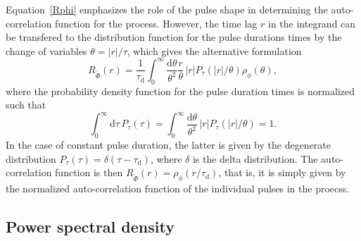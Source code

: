 \documentclass[aps,prb,12pt,a4paper,preprint,amsmath,amssymb,groupedaddress]{revtex4-1}
\newcommand{\abs}[1]{{\left|#1\right|}}\newcommand{\order}[1]{{\mathcal{O}\left(#1\right)}}
\newcommand{\rmd}{\text{d}}
\newcommand{\taud}{\ensuremath{\tau_\text{d}}}
\newcommand{\Phiwt}{\ensuremath{\widetilde{\Phi}}}
\begin{document}
Equation~\eqref{Rphi} emphasizes the role of the pulse shape in determining the auto-correlation function for the process. However, the time lag $r$ in the integrand can be transfered to the distribution function for the pulse durations times by the change of variables $\theta=\abs{r}/\tau$, which gives the alternative formulation
\begin{equation}
R_{\Phiwt}(r) = \frac{1}{\taud}\int_0^\infty \frac{\rmd\theta}{\theta^2}\frac{r}{\theta}\,\abs{r} P_\tau(\abs{r}/\theta)\rho_\phi(\theta) , 
\end{equation}
where the probability density function for the pulse duration times is normalized such that
\begin{equation}
\int_0^\infty \rmd\tau\,P_\tau(\tau) = \int_0^\infty \frac{\rmd\theta}{\theta^2}\,\abs{r} P_\tau(\abs{r}/\theta) = 1 .
\end{equation}
In the case of constant pulse duration, the latter is given by the degenerate distribution $P_\tau(\tau)=\delta(\tau-\taud)$, where $\delta$ is the delta distribution. The auto-correlation function is then $R_{\Phiwt}(r)=\rho_\phi(r/\taud)$, that is, it is simply given by the normalized auto-correlation function of the individual pulses in the proecss. 



\subsection{Power spectral density}
\end{document}
